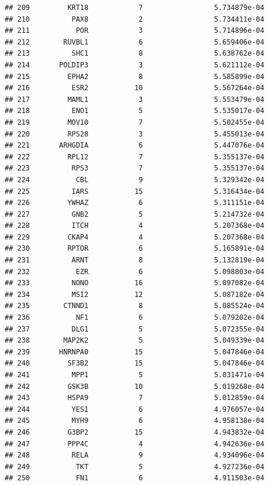 \documentclass[
]{article}
\begin{document}
\begin{verbatim}
## 209         KRT18            7                 5.734879e-04
## 210          PAX8            2                 5.734411e-04
## 211           POR            3                 5.714896e-04
## 212        RUVBL1            6                 5.659406e-04
## 213          SHC1            8                 5.638762e-04
## 214       POLDIP3            3                 5.621112e-04
## 215         EPHA2            8                 5.585899e-04
## 216          ESR2           10                 5.567264e-04
## 217         MAML1            3                 5.553479e-04
## 218          ENO1            5                 5.535017e-04
## 219         MOV10            7                 5.502455e-04
## 220         RPS28            3                 5.455013e-04
## 221       ARHGDIA            6                 5.447076e-04
## 222         RPL12            7                 5.355137e-04
## 223          RPS3            7                 5.355137e-04
## 224           CBL            9                 5.329342e-04
## 225          IARS           15                 5.316434e-04
## 226         YWHAZ            6                 5.311151e-04
## 227          GNB2            5                 5.214732e-04
## 228          ITCH            4                 5.207368e-04
## 229         CKAP4            4                 5.207368e-04
## 230         RPTOR            6                 5.165891e-04
## 231          ARNT            8                 5.132819e-04
## 232           EZR            6                 5.098803e-04
## 233          NONO           16                 5.097082e-04
## 234          MSI2           12                 5.087182e-04
## 235        CTNND1            8                 5.085524e-04
## 236           NF1            6                 5.079202e-04
## 237          DLG1            5                 5.072355e-04
## 238        MAP2K2            5                 5.049339e-04
## 239       HNRNPA0           15                 5.047846e-04
## 240         SF3B2           15                 5.047846e-04
## 241          MPP1            5                 5.031471e-04
## 242         GSK3B           10                 5.019268e-04
## 243         HSPA9            7                 5.012859e-04
## 244          YES1            6                 4.976057e-04
## 245          MYH9            6                 4.958138e-04
## 246         G3BP2           15                 4.943832e-04
## 247         PPP4C            4                 4.942636e-04
## 248          RELA            9                 4.934096e-04
## 249           TKT            5                 4.927236e-04
## 250           FN1            6                 4.911503e-04

\end{verbatim}
\end{document}
